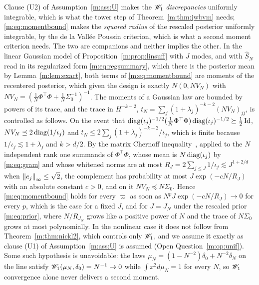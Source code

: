 \begin{remark}\label{m:rem:momentbound}
Clause (U2) of Assumption~\ref{m:ass:U} makes the $\mathscr{W}_1$ \emph{discrepancies} uniformly integrable, which is what the tower step of Theorem~\ref{m:thm:jwbvm} needs; \eqref{m:eq:momentbound} makes the \emph{squared radius} of the rescaled posterior uniformly integrable, by the de la Vall\'ee Poussin criterion, which is what a second moment criterion needs. The two are companions and neither implies the other. In the linear Gaussian model of Proposition~\ref{m:prop:linsuff} with $J$ modes, and with $\hat S_N$ read in its regularized form \eqref{m:eq:regsummary}, which there is the posterior mean by Lemma~\ref{m:lem:exact}, both terms of \eqref{m:eq:momentbound} are moments of the recentered posterior, which given the design is exactly $N(0,NV_N)$ with $NV_N=(\tfrac1N\Phi^\top\Phi+\tfrac1N\Sigma_0^{-1})^{-1}$. The moments of a Gaussian law are bounded by powers of its trace, and the trace in $H^{-k-2}$, $t_N=\sum_j(1+\lambda_j)^{-k-2}(NV_N)_{jj}$, is controlled as follows. On the event that $\operatorname{diag}(\iota_j)^{-1/2}(\tfrac1N\Phi^\top\Phi)\operatorname{diag}(\iota_j)^{-1/2}\succeq\tfrac12\operatorname{Id}$, $NV_N\preceq2\operatorname{diag}(1/\iota_j)$ and $t_N\le2\sum_j(1+\lambda_j)^{-k-2}/\iota_j$, which is finite because $1/\iota_j\lesssim1+\lambda_j$ and $k>d/2$. By the matrix Chernoff inequality~\cite{tropp2015}, applied to the $N$ independent rank one summands of $\Phi^\top\Phi$, whose mean is $N\operatorname{diag}(\iota_j)$ by \eqref{m:eq:gram} and whose whitened norms are at most $R_J=2\sum_{j\le J}1/\iota_j\lesssim J^{1+2/d}$ when $\left\|e_j\right\|_\infty\le\sqrt2$, the complement has probability at most $J\exp(-cN/R_J)$ with an absolute constant $c>0$, and on it $NV_N\preceq N\Sigma_0$. Hence \eqref{m:eq:momentbound} holds for every $\varpi$ as soon as $N^pJ\exp(-cN/R_J)\to0$ for every $p$, which is the case for a fixed $J$, and for $J=J_N$ under the rescaled prior \eqref{m:eq:prior}, where $N/R_{J_N}$ grows like a positive power of $N$ and the trace of $N\Sigma_0$ grows at most polynomially. In the nonlinear case it does not follow from Theorem~\ref{m:thm:nickl2}, which controls only $\mathscr{W}_1$, and we assume it exactly as clause (U1) of Assumption~\ref{m:ass:U} is assumed (Open Question~\ref{m:op:unif}). Some such hypothesis is unavoidable: the laws $\mu_N=(1-N^{-2})\delta_0+N^{-2}\delta_N$ on the line satisfy $\mathscr{W}_1(\mu_N,\delta_0)=N^{-1}\to0$ while $\int x^2d\mu_N=1$ for every $N$, so $\mathscr{W}_1$ convergence alone never delivers a second moment.
\end{remark}

